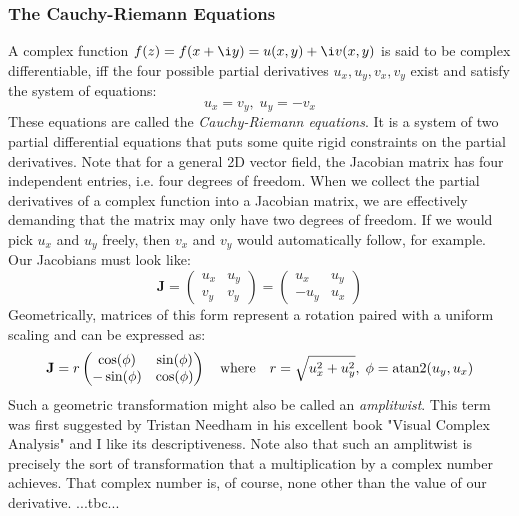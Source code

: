 \subsubsection{The Cauchy-Riemann Equations}
A complex function $f(z) = f(x + \i y) = u(x,y) + \i v(x,y)$ is said to be complex differentiable, iff the four possible partial derivatives $u_x, u_y, v_x, v_y$ exist and satisfy the system of equations:
\begin{equation}
 u_x = v_y, \; u_y = -v_x
\end{equation}
These equations are called the \emph{Cauchy-Riemann equations}. It is a system of two partial differential equations that puts some quite rigid constraints on the partial derivatives. Note that for a general 2D vector field, the Jacobian matrix has four independent entries, i.e. four degrees of freedom. When we collect the partial derivatives of a complex function into a Jacobian matrix, we are effectively demanding that the matrix may only have two degrees of freedom. If we would pick $u_x$ and $u_y$ freely, then $v_x$ and $v_y$ would automatically follow, for example. Our Jacobians must look like:
\begin{equation}
 \mathbf{J} =   \begin{pmatrix} u_x & u_y \\	 v_y & v_y \end{pmatrix}
            =   \begin{pmatrix} u_x & u_y \\	-u_y & u_x \end{pmatrix}
\end{equation}
Geometrically, matrices of this form represent a rotation paired with a uniform scaling and can be expressed as:
\begin{equation}
	 \mathbf{J} = r \begin{pmatrix}  \cos(\phi)   & \sin(\phi)   \\	
                              	 	-\sin(\phi)   & \cos(\phi)   \end{pmatrix}
	\quad \text{where}  \quad
	r = \sqrt{u_x^2 + u_y^2}, \; \phi = \atan2(u_y, u_x)
\end{equation}
Such a geometric transformation might also be called an \emph{amplitwist}. This term was first suggested by Tristan Needham in his excellent book "Visual Complex Analysis" and I like its descriptiveness. Note also that such an amplitwist is precisely the sort of transformation that a multiplication by a complex number achieves. That complex number is, of course, none other than the value of our derivative. ...tbc...

